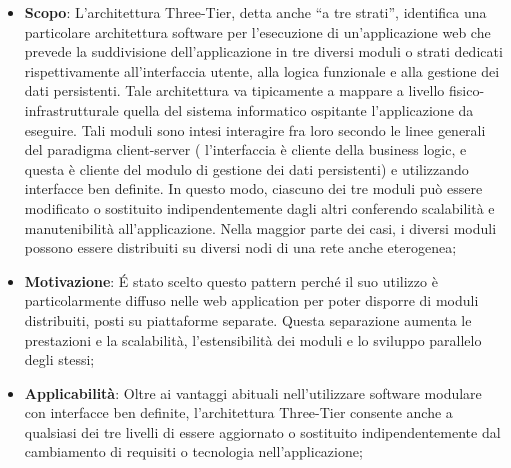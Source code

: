 		\begin{itemize}
			\item \textbf{Scopo}: L'architettura Three-Tier, detta anche ``a tre strati'', identifica una particolare architettura software per l'esecuzione di un'applicazione web che prevede la suddivisione dell'applicazione in tre diversi moduli o strati dedicati rispettivamente all'interfaccia utente, alla logica funzionale e alla gestione dei dati persistenti. Tale architettura va tipicamente a mappare a livello fisico-infrastrutturale quella del sistema informatico ospitante l'applicazione da eseguire.
Tali moduli sono intesi interagire fra loro secondo le linee generali del paradigma client-server ( l'interfaccia è cliente della business logic, e questa è cliente del modulo di gestione dei dati persistenti) e utilizzando interfacce ben definite. In questo modo, ciascuno dei tre moduli può essere modificato o sostituito indipendentemente dagli altri conferendo scalabilità e manutenibilità all'applicazione. Nella maggior parte dei casi, i diversi moduli possono essere distribuiti su diversi nodi di una rete anche eterogenea;

			\item \textbf{Motivazione}: \'E stato scelto questo pattern perché il suo utilizzo è particolarmente diffuso nelle web application per poter disporre di moduli distribuiti, posti su piattaforme separate. Questa separazione aumenta le prestazioni e la scalabilità, l'estensibilità dei moduli e lo sviluppo parallelo degli stessi;

			\item \textbf{Applicabilità}: Oltre ai vantaggi abituali nell'utilizzare software modulare con interfacce ben definite, l'architettura Three-Tier consente anche a qualsiasi dei tre livelli di essere aggiornato o sostituito indipendentemente dal cambiamento di requisiti o tecnologia nell'applicazione;

		\end{itemize}


		\newpage
